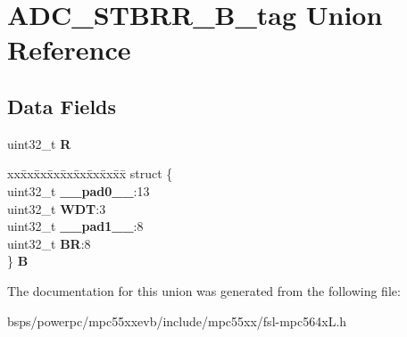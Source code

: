 \hypertarget{unionADC__STBRR__32B__tag}{}\section{A\+D\+C\+\_\+\+S\+T\+B\+R\+R\+\_\+B\+\_\+tag Union Reference}
\label{unionADC__STBRR__32B__tag}
\subsection*{Data Fields}
\begin{DoxyCompactItemize}
\item 
\mbox{\label{unionADC__STBRR__32B__tag_a82a578b1802ae334f6b2132c1bb3702e}} 
uint32\+\_\+t {\bfseries R}
\item 
\mbox{\label{unionADC__STBRR__32B__tag_a06eb34e9c1cdc6e60b267ddca9412472}} 
\begin{tabbing}
xx\=xx\=xx\=xx\=xx\=xx\=xx\=xx\=xx\=\kill
struct \{\\
\>uint32\_t {\bfseries \_\_pad0\_\_}:13\\
\>uint32\_t {\bfseries WDT}:3\\
\>uint32\_t {\bfseries \_\_pad1\_\_}:8\\
\>uint32\_t {\bfseries BR}:8\\
\} {\bfseries B}\\

\end{tabbing}\end{DoxyCompactItemize}


The documentation for this union was generated from the following file\+:\begin{DoxyCompactItemize}
\item 
bsps/powerpc/mpc55xxevb/include/mpc55xx/fsl-\/mpc564x\+L.\+h\end{DoxyCompactItemize}
